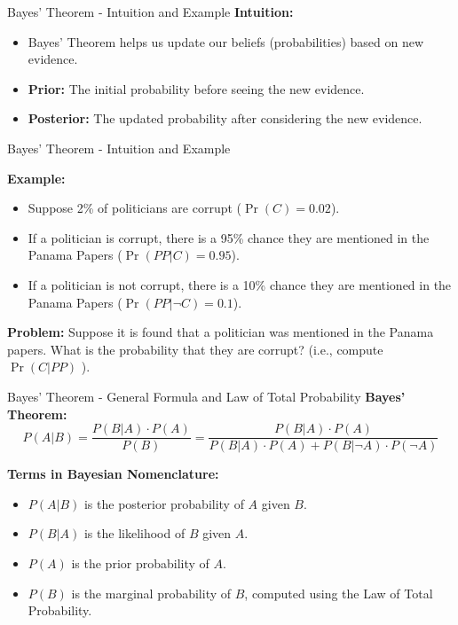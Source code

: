 \documentclass[handout]{beamer} %
\begin{document}


\begin{frame}{Bayes' Theorem - Intuition and Example}
    \textbf{Intuition:}\pause
    \begin{itemize}
        \item Bayes' Theorem helps us update our beliefs (probabilities) based on new evidence.\pause
        \item \textbf{Prior:} The initial probability before seeing the new evidence.\pause
        \item \textbf{Posterior:} The updated probability after considering the new evidence.
    \end{itemize}
\end{frame}


\begin{frame}{Bayes' Theorem - Intuition and Example}

    \textbf{Example:}\pause
    \begin{itemize}
        \item Suppose 2\% of politicians are corrupt (\(\Pr(C) = 0.02\)).\pause
        \item If a politician is corrupt, there is a 95\% chance they are mentioned in the Panama Papers (\(\Pr(PP|C) = 0.95\)).\pause
        \item If a politician is not corrupt, there is a 10\% chance they are mentioned in the Panama Papers (\(\Pr(PP|\neg C) = 0.1\)).\pause
    \end{itemize}

    \textbf{Problem:} Suppose it is found that a politician was mentioned in the Panama papers. What is the probability that they are corrupt? (i.e., compute \(\Pr(C|PP)\) ).
\end{frame}


\begin{frame}{Bayes' Theorem - General Formula and Law of Total Probability}
    \textbf{Bayes' Theorem:}
    \[
    P(A|B) = \dfrac{P(B|A) \cdot P(A)}{P(B)} = \frac{P(B|A) \cdot P(A)}{P(B|A) \cdot P(A) + P(B|\neg A) \cdot P(\neg A)}
    \]\pause

    \textbf{Terms in Bayesian Nomenclature:}\pause
    \begin{itemize}
        \item \(P(A|B)\) is the posterior probability of \(A\) given \(B\).\pause
        \item \(P(B|A)\) is the likelihood of \(B\) given \(A\).\pause
        \item \(P(A)\) is the prior probability of \(A\).\pause
        \item \(P(B)\) is the marginal probability of \(B\), computed using the Law of Total Probability.\pause
    \end{itemize}
\end{frame}
\end{document}
